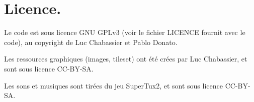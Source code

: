 \documentclass{article}
\begin{document}
\section{Licence.}
Le code est sous licence GNU GPLv3 (voir le fichier LICENCE fournit avec le code), au copyright de Luc Chabassier et Pablo Donato.

Les ressources graphiques (images, tileset) ont été crées par Luc Chabassier, et sont sous licence CC-BY-SA.

Les sons et musiques sont tirées du jeu SuperTux2, et sont sous licence CC-BY-SA.
\end{document}
